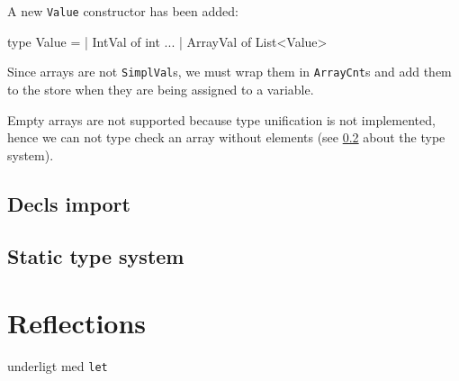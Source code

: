 \documentclass{article}
\begin{document}
A new {\tt Value} constructor has been added:
\begin{fs}
type Value    = | IntVal of int
                ...
                | ArrayVal of List<Value>
\end{fs}

Since arrays are not {\tt SimplVal}s, we must wrap them in {\tt ArrayCnt}s and add them to the store when they are being assigned to a variable.

Empty arrays are not supported because type unification is not implemented, hence we can not type check an array without elements (see \ref{sec:type} about the type system).

\subsection{Decls import}
\subsection{Static type system}
\label{sec:type}


\section{Reflections}
underligt med {\tt let}
\end{document}
